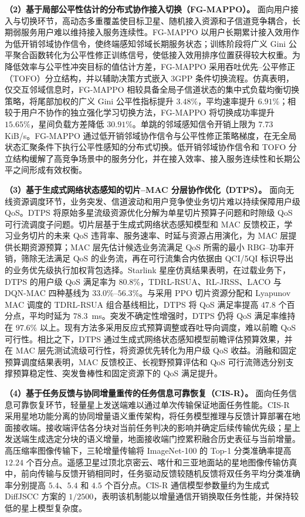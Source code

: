 \textbf{（2）基于局部公平性估计的分布式协作接入切换（FG-MAPPO）。} 面向用户接入与切换环节，高动态多重覆盖使目标卫星、随机接入资源和子信道竞争耦合，长期弱服务用户难以维持接入服务连续性。FG-MAPPO 以用户长期累计接入效用作为低开销邻域协作信令，使终端感知邻域长期服务状态；训练阶段将广义 Gini 公平聚合函数转化为公平性修正训练信号，使低接入效用排序位置获得较大权重。为降低效率与公平性冲突目标的值估计方差，FG-MAPPO 采用吞吐优先--公平修正（TOFO）分立结构，并以辅助决策方式嵌入 3GPP 条件切换流程。仿真表明，仅交互邻域信息时，FG-MAPPO 相较具备全局子信道状态的集中式负载均衡切换策略，将尾部加权的广义 Gini 公平性指标提升 $3.48\%$，平均速率提升 $6.91\%$；相较于用户不协作的独立强化学习切换方法，FG-MAPPO 将切换成功率提升 $15.65\%$，星间负载方差降低 $30.91\%$。单跳的邻域感知信令开销上限为 $7.73$ KiB/s。FG-MAPPO 通过低开销邻域协作信令与公平性修正策略梯度，在无全局状态汇聚条件下执行公平性感知的分布式切换。低开销邻域协作信令和 TOFO 分立结构缓解了高竞争场景中的服务分化，并在接入效率、接入服务连续性和长期公平之间形成有效权衡。

\textbf{（3）基于生成式网络状态感知的切片--MAC 分层协作优化（DTPS）。} 面向无线资源调度环节，业务突发、信道波动和用户竞争使业务切片难以持续保障用户级 QoS。DTPS 将原始多星流级资源优化分解为单星切片预算子问题和时隙级 QoS 可行流调度子问题。切片层基于生成式网络状态感知模型和 MAC 反馈校正，学习业务切片的未来 QoS 违背率、服务速率、时延与资源占用演化，为 MAC 层提供长期资源预算；MAC 层先估计候选业务流满足 QoS 所需的最小 RBG--功率开销，筛除无法满足 QoS 的业务流，再在可行流集合内依据由 QCI/5QI 标识导出的业务优先级执行加权背包选择。Starlink 星座仿真结果表明，在过载业务下，DTPS 的用户级 QoS 满足率为 $80.8\%$，TDRL-RSUA、RL-JRSS、LACO 与 DQN-MAC 四种基线为 $33.0\%$--$56.3\%$。与采用 PPO 切片资源分配和 Lyapunov MAC 调度的 TDRL-RSUA 组合基线相比，DTPS 将 QoS 满足率提高 $47.8$ 个百分点，平均时延为 $78.3$~ms。突发不确定性增强时，DTPS 仍将 QoS 满足率维持在 $97.6\%$ 以上。现有方法多采用反应式预算调整或吞吐导向调度，难以前瞻 QoS 可行性。相比之下，DTPS 通过生成式网络状态感知模型前瞻评估预算效果，并在 MAC 层先测试流级可行性，将资源优先转化为用户级 QoS 收益。消融和固定预算调度结果表明，MAC 反馈校正、长视野预算评估和 QoS 可行流筛选分别支撑预算稳定性、突发鲁棒性和固定资源下的 QoS 满足提升。

\textbf{（4）基于任务反馈与协同增量重传的任务信息可靠恢复（CIS-R）。} 面向任务信息可靠恢复环节，轻量星上发送端难以通过单次传输保证地面任务性能。CIS-R 采用星地功能分离的协同增量语义重传架构，将任务模型推理与反馈计算部署在地面接收端。接收端评估各分块对当前任务判决的影响并确定后续传输优先级；星上发送端生成选定分块的语义增量，地面接收端门控累积融合历史表征与当前增量。高压缩率图像传输下，三轮增量传输将 ImageNet-100 的 Top-1 分类准确率提高 $12.24$ 个百分点。遥感卫星过顶北京密云、喀什和三亚地面站的星地图像传输仿真中，前向传输与反馈开销相同时，任务驱动反馈较随机反馈将双任务平均分类准确率分别提高 $5.4$、$5.4$ 和 $4.5$ 个百分点。CIS-R 通信模型参数量约为生成式 DiffJSCC 方案的 $1/2500$，表明该机制能以增量通信开销换取任务性能，并保持较低的星上模型复杂度。

